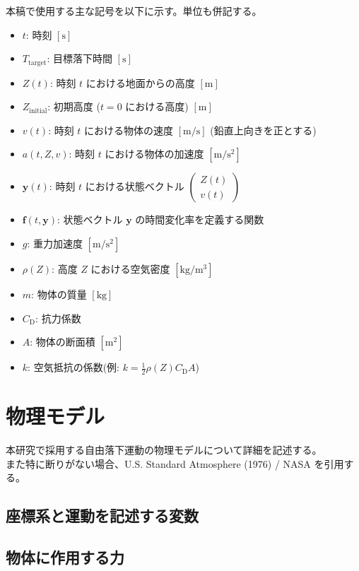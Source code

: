 \documentclass[a4paper,12pt]{article}
\begin{document}
本稿で使用する主な記号を以下に示す。単位も併記する。
\begin{itemize}
    \item $t$: 時刻 $[\mathrm{s}]$
    \item $T_{\mathrm{target}}$: 目標落下時間 $[\mathrm{s}]$
    \item $Z(t)$: 時刻 $t$ における地面からの高度 $[\mathrm{m}]$
    \item $Z_{\mathrm{initial}}$: 初期高度 ($t=0$ における高度) $[\mathrm{m}]$
    \item $v(t)$: 時刻 $t$ における物体の速度 $[\mathrm{m/s}]$ (鉛直上向きを正とする)
    \item $a(t, Z, v)$: 時刻 $t$ における物体の加速度 $[\mathrm{m/s^2}]$
    \item $\bm{y}(t)$: 時刻 $t$ における状態ベクトル $\begin{pmatrix} Z(t) \\ v(t) \end{pmatrix}$
    \item $\bm{f}(t, \bm{y})$: 状態ベクトル $\bm{y}$ の時間変化率を定義する関数
    \item $g$: 重力加速度 $[\mathrm{m/s^2}]$
    \item $\rho(Z)$: 高度 $Z$ における空気密度 $[\mathrm{kg/m^3}]$
    \item $m$: 物体の質量 $[\mathrm{kg}]$
    \item $C_{\mathrm{D}}$: 抗力係数
    \item $A$: 物体の断面積 $[\mathrm{m^2}]$
    \item $k$: 空気抵抗の係数(例: $k = \frac{1}{2} \rho(Z) C_{\mathrm{D}} A$)
\end{itemize}

\section{物理モデル}
\label{sec:physics_model}

本研究で採用する自由落下運動の物理モデルについて詳細を記述する。\\
また特に断りがない場合、U.S. Standard Atmosphere (1976) / NASA を引用する。
\subsection*{座標系と運動を記述する変数}


\subsection*{物体に作用する力}
\end{document}
